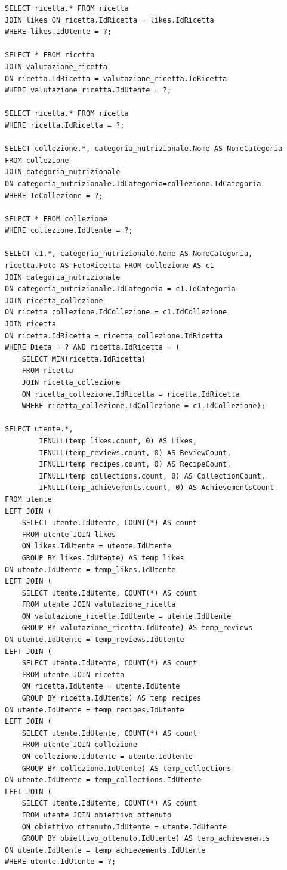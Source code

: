﻿\documentclass[a4paper,12pt]{report}
\begin{document}
\begin{verbatim}
SELECT ricetta.* FROM ricetta
JOIN likes ON ricetta.IdRicetta = likes.IdRicetta
WHERE likes.IdUtente = ?;

SELECT * FROM ricetta
JOIN valutazione_ricetta
ON ricetta.IdRicetta = valutazione_ricetta.IdRicetta
WHERE valutazione_ricetta.IdUtente = ?;

SELECT ricetta.* FROM ricetta
WHERE ricetta.IdRicetta = ?;

SELECT collezione.*, categoria_nutrizionale.Nome AS NomeCategoria
FROM collezione
JOIN categoria_nutrizionale
ON categoria_nutrizionale.IdCategoria=collezione.IdCategoria
WHERE IdCollezione = ?;

SELECT * FROM collezione
WHERE collezione.IdUtente = ?;

SELECT c1.*, categoria_nutrizionale.Nome AS NomeCategoria,
ricetta.Foto AS FotoRicetta FROM collezione AS c1
JOIN categoria_nutrizionale 
ON categoria_nutrizionale.IdCategoria = c1.IdCategoria
JOIN ricetta_collezione 
ON ricetta_collezione.IdCollezione = c1.IdCollezione
JOIN ricetta 
ON ricetta.IdRicetta = ricetta_collezione.IdRicetta
WHERE Dieta = ? AND ricetta.IdRicetta = (
    SELECT MIN(ricetta.IdRicetta)
    FROM ricetta
    JOIN ricetta_collezione
    ON ricetta_collezione.IdRicetta = ricetta.IdRicetta
    WHERE ricetta_collezione.IdCollezione = c1.IdCollezione);

SELECT utente.*,
        IFNULL(temp_likes.count, 0) AS Likes,
        IFNULL(temp_reviews.count, 0) AS ReviewCount,
        IFNULL(temp_recipes.count, 0) AS RecipeCount,
        IFNULL(temp_collections.count, 0) AS CollectionCount,
        IFNULL(temp_achievements.count, 0) AS AchievementsCount
FROM utente
LEFT JOIN (
    SELECT utente.IdUtente, COUNT(*) AS count
    FROM utente JOIN likes
    ON likes.IdUtente = utente.IdUtente
    GROUP BY likes.IdUtente) AS temp_likes
ON utente.IdUtente = temp_likes.IdUtente
LEFT JOIN (
    SELECT utente.IdUtente, COUNT(*) AS count
    FROM utente JOIN valutazione_ricetta
    ON valutazione_ricetta.IdUtente = utente.IdUtente
    GROUP BY valutazione_ricetta.IdUtente) AS temp_reviews
ON utente.IdUtente = temp_reviews.IdUtente
LEFT JOIN (
    SELECT utente.IdUtente, COUNT(*) AS count
    FROM utente JOIN ricetta
    ON ricetta.IdUtente = utente.IdUtente
    GROUP BY ricetta.IdUtente) AS temp_recipes
ON utente.IdUtente = temp_recipes.IdUtente
LEFT JOIN (
    SELECT utente.IdUtente, COUNT(*) AS count
    FROM utente JOIN collezione
    ON collezione.IdUtente = utente.IdUtente
    GROUP BY collezione.IdUtente) AS temp_collections
ON utente.IdUtente = temp_collections.IdUtente
LEFT JOIN (
    SELECT utente.IdUtente, COUNT(*) AS count
    FROM utente JOIN obiettivo_ottenuto
    ON obiettivo_ottenuto.IdUtente = utente.IdUtente
    GROUP BY obiettivo_ottenuto.IdUtente) AS temp_achievements
ON utente.IdUtente = temp_achievements.IdUtente
WHERE utente.IdUtente = ?;


\end{verbatim}
\end{document}
